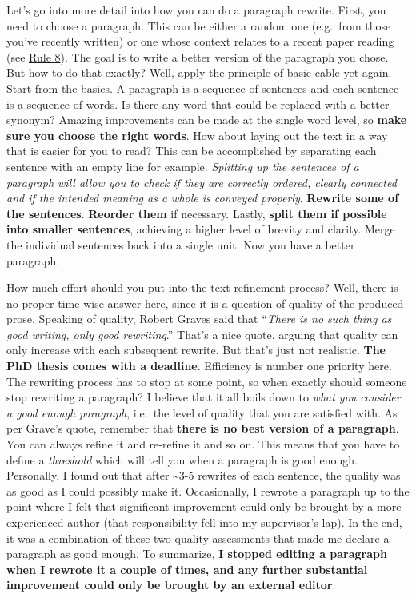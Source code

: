 \documentclass[
  12pt,
]{book}
\begin{document}
Let's go into more detail into how you can do a paragraph rewrite.
First, you need to choose a paragraph.
This can be either a random one (e.g.~from those you've recently written) or one whose context relates to a recent paper reading (see \protect\hyperlink{rule8}{Rule 8}).
The goal is to write a better version of the paragraph you chose.
But how to do that exactly?
Well, apply the principle of basic cable yet again.
Start from the basics.
A paragraph is a sequence of sentences and each sentence is a sequence of words.
Is there any word that could be replaced with a better synonym?
Amazing improvements can be made at the single word level, so \textbf{make sure you choose the right words}.
How about laying out the text in a way that is easier for you to read?
This can be accomplished by separating each sentence with an empty line for example.
\emph{Splitting up the sentences of a paragraph will allow you to check if they are correctly ordered, clearly connected and if the intended meaning as a whole is conveyed properly}.
\textbf{Rewrite some of the sentences}.
\textbf{Reorder them} if necessary.
Lastly, \textbf{split them if possible into smaller sentences}, achieving a higher level of brevity and clarity.
Merge the individual sentences back into a single unit.
Now you have a better paragraph.

How much effort should you put into the text refinement process?
Well, there is no proper time-wise answer here, since it is a question of quality of the produced prose.
Speaking of quality, Robert Graves said that ``\emph{There is no such thing as good writing, only good rewriting}.''
That's a nice quote, arguing that quality can only increase with each subsequent rewrite.
But that's just not realistic.
\textbf{The PhD thesis comes with a deadline}.
Efficiency is number one priority here.
The rewriting process has to stop at some point, so when exactly should someone stop rewriting a paragraph?
I believe that it all boils down to \emph{what you consider a good enough paragraph}, i.e.~the level of quality that you are satisfied with.
As per Grave's quote, remember that \textbf{there is no best version of a paragraph}.
You can always refine it and re-refine it and so on.
This means that you have to define a \emph{threshold} which will tell you when a paragraph is good enough.
Personally, I found out that after \textasciitilde3-5 rewrites of each sentence, the quality was as good as I could possibly make it.
Occasionally, I rewrote a paragraph up to the point where I felt that significant improvement could only be brought by a more experienced author (that responsibility fell into my supervisor's lap).
In the end, it was a combination of these two quality assessments that made me declare a paragraph as good enough.
To summarize, \textbf{I stopped editing a paragraph when I rewrote it a couple of times, and any further substantial improvement could only be brought by an external editor}.
\end{document}
